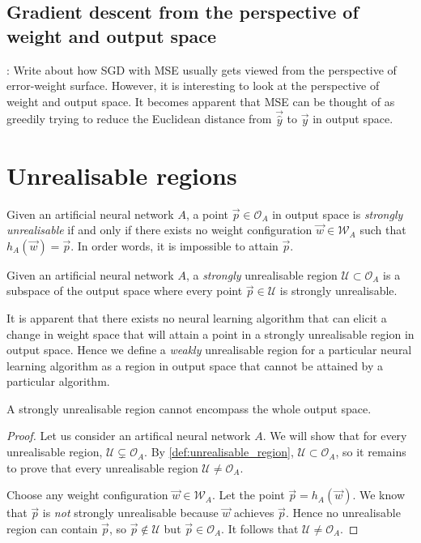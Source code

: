 \subsection{Gradient descent from the perspective of weight and output space}
\todo: Write about how SGD with MSE usually gets viewed from the perspective of error-weight surface. However, it is interesting to look at the perspective of weight and output space. It becomes apparent that MSE can be thought of as greedily trying to reduce the Euclidean distance from $\vec{\hat{y}}$ to $\vec{y}$ in output space.

\section{Unrealisable regions}
\begin{definition}
    \label{def:unrealisable_point}
    Given an artificial neural network $A$, a point $\vec{p} \in \mathcal{O}_A$ in output space is \textit{strongly unrealisable} if and only if there exists no weight configuration $\vec{w} \in \mathcal{W}_A$ such that $h_A(\vec{w}) = \vec{p}$.
    In order words, it is impossible to attain $\vec{p}$.
\end{definition}
\begin{definition}
    \label{def:unrealisable_region}
    Given an artificial neural network $A$, a \textit{strongly} unrealisable region $\mathcal{U} \subset \mathcal{O}_A$ is a subspace of the output space where every point $\vec{p} \in \mathcal{U}$ is strongly unrealisable.
    
    It is apparent that there exists no neural learning algorithm that can elicit a change in weight space that will attain a point in a strongly unrealisable region in output space.
    Hence we define a \textit{weakly} unrealisable region for a particular neural learning algorithm as a region in output space that cannot be attained by a particular algorithm.
\end{definition}

\begin{lemma}
    A strongly unrealisable region cannot encompass the whole output space.
\end{lemma}
\begin{proof}
    Let us consider an artifical neural network $A$. 
    We will show that for every unrealisable region, $\mathcal{U} \subsetneq \mathcal{O}_A$.
    By \ref{def:unrealisable_region}, $\mathcal{U} \subset \mathcal{O}_A$, so it remains to prove that every unrealisable region $\mathcal{U} \neq \mathcal{O}_A$.

    Choose any weight configuration $\vec{w} \in \mathcal{W}_A$. 
    Let the point $\vec{p}=h_A(\vec{w})$. 
    We know that $\vec{p}$ is \textit{not} strongly unrealisable because $\vec{w}$ achieves $\vec{p}$. 
    Hence no unrealisable region can contain $\vec{p}$, so $\vec{p} \notin \mathcal{U}$ but $\vec{p} \in \mathcal{O}_A$. 
    It follows that $\mathcal{U} \neq \mathcal{O}_A$.
\end{proof}

